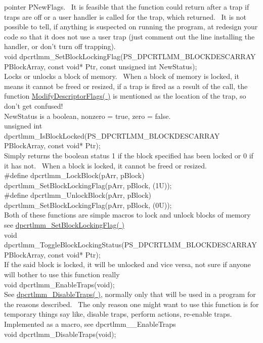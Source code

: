 \documentclass{article}
\begin{document}
pointer PNewFlags.~ It is feasible that the function could return
after a trap if traps are off or a user handler is called for the trap,
which returned.~ It is not possible to tell, if anything is
suspected
on running the program, at redesign your code so that it does not use a
user trap (just comment out the line installing the handler, or don't
turn
off trapping).
\\
void
dpcrtlmm\_SetBlockLockingFlag(PS\_DPCRTLMM\_BLOCKDESCARRAY
PBlockArray, const void* Ptr, const unsigned int NewStatus);
\\
Locks or unlocks a block of memory.~ When a block of memory is
locked, it means it cannot be freed or resized, if a trap is fired as a
result of the call, the function \href{#ModifyDescriptorFlags}{ModifyDescriptorFlags(
)} is mentioned as the location of the trap, so don't get confused!
\\
NewStatus is a boolean, nonzero = true, zero = false.
\\
unsigned int
dpcrtlmm\_IsBlockLocked(PS\_DPCRTLMM\_BLOCKDESCARRAY
PBlockArray, const void* Ptr);
\\
Simply returns the boolean status 1 if the block specified has been
locked or 0 if it has not.~ When a block is locked, it cannot be
freed
or resized.
\\
\#define dpcrtlmm\_LockBlock(pArr, pBlock)
dpcrtlmm\_SetBlockLockingFlag(pArr,
pBlock, (1U));
\\
\#define dpcrtlmm\_UnlockBlock(pArr, pBlock)
dpcrtlmm\_SetBlockLockingFlag(pArr,
pBlock, (0U));
\\
Both of these functions are simple macros to lock and unlock blocks
of memory see \href{#SetBlockLockingFlag}{dpcrtlmm\_SetBlockLockingFlag(
)}
\\
void
dpcrtlmm\_ToggleBlockLockingStatus(PS\_DPCRTLMM\_BLOCKDESCARRAY
PBlockArray, const void* Ptr);
\\
If the said block is locked, it will be unlocked and vice versa, not
sure if anyone will bother to use this function really
\\
void dpcrtlmm\_EnableTraps(void);
\\
See \href{#DisableTraps}{dpcrtlmm\_DisableTraps( )}, normally
only that will be used in a program for the reasons described.~
The
only reason one might want to use this function is for temporary things
say like, disable traps, perform actions, re-enable traps.~
Implemented
as a macro, see dpcrtlmm\_\_EnableTraps
\\
void dpcrtlmm\_DisableTraps(void);
\\
\end{document}
